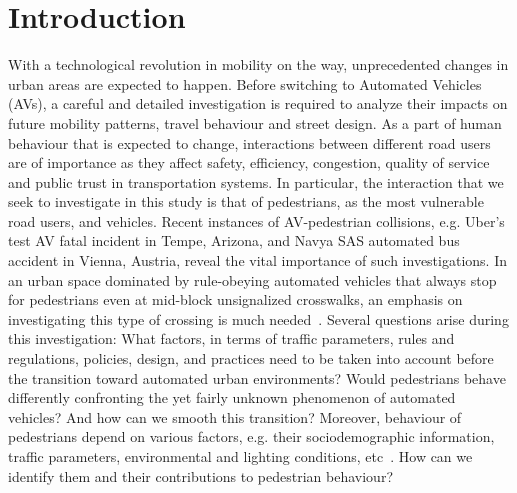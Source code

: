 \section{Introduction}
\label{S:intro}
With a technological revolution in mobility on the way, unprecedented changes in urban areas are expected to happen. Before switching to Automated Vehicles (AVs), a careful and detailed investigation is required to analyze their impacts on future mobility patterns, travel behaviour and street design. As a part of human behaviour that is expected to change, interactions between different road users are of importance as they affect safety, efficiency, congestion, quality of service and public trust in transportation systems. In particular, the interaction that we seek to investigate in this study is that of pedestrians, as the most vulnerable road users, and vehicles. Recent instances of AV-pedestrian collisions, e.g. Uber's test AV fatal incident in Tempe, Arizona, and Navya SAS automated bus accident in Vienna, Austria, reveal the vital importance of such investigations. In an urban space dominated by rule-obeying automated vehicles that always stop for pedestrians even at mid-block unsignalized crosswalks, an emphasis on investigating this type of crossing is much needed~\cite{millard2018pedestrians}.
Several questions arise during this investigation: What factors, in terms of traffic parameters, rules and regulations, policies, design, and practices need to be taken into account before the transition toward automated urban environments? Would pedestrians behave differently confronting the yet fairly unknown phenomenon of automated vehicles? And how can we smooth this transition? Moreover, behaviour of pedestrians depend on various factors, e.g. their sociodemographic information, traffic parameters, environmental and lighting conditions, etc~\cite{rasouli2019autonomous}. How can we identify them and their contributions to pedestrian behaviour?

